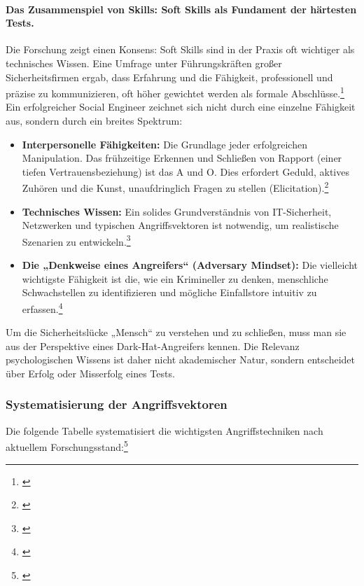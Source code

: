 \documentclass[10pt,a4paper]{article}
\begin{document}
	\paragraph{Das Zusammenspiel von Skills: Soft Skills als Fundament der härtesten Tests.}
	Die Forschung zeigt einen Konsens: Soft Skills sind in der Praxis oft wichtiger als technisches Wissen. Eine Umfrage unter Führungskräften großer Sicherheitsfirmen ergab, dass Erfahrung und die Fähigkeit, professionell und präzise zu kommunizieren, oft höher gewichtet werden als formale Abschlüsse.\footnote{\cite{SECareer}} Ein erfolgreicher Social Engineer zeichnet sich nicht durch eine einzelne Fähigkeit aus, sondern durch ein breites Spektrum:
	\begin{itemize}
		\item \textbf{Interpersonelle Fähigkeiten:} Die Grundlage jeder erfolgreichen Manipulation. Das frühzeitige Erkennen und Schließen von Rapport (einer tiefen Vertrauensbeziehung) ist das A und O. Dies erfordert Geduld, aktives Zuhören und die Kunst, unaufdringlich Fragen zu stellen (Elicitation).\footnote{\cite{SESkills}}
		\item \textbf{Technisches Wissen:} Ein solides Grundverständnis von IT-Sicherheit, Netzwerken und typischen Angriffsvektoren ist notwendig, um realistische Szenarien zu entwickeln.\footnote{\cite{ZipRecruiterSkills}}
		\item \textbf{Die „Denkweise eines Angreifers“ (Adversary Mindset):} Die vielleicht wichtigste Fähigkeit ist die, wie ein Krimineller zu denken, menschliche Schwachstellen zu identifizieren und mögliche Einfallstore intuitiv zu erfassen.\footnote{\cite{SECareer}}
	\end{itemize}
	Um die Sicherheitslücke „Mensch“ zu verstehen und zu schließen, muss man sie aus der Perspektive eines Dark-Hat-Angreifers kennen. Die Relevanz psychologischen Wissens ist daher nicht akademischer Natur, sondern entscheidet über Erfolg oder Misserfolg eines Tests.
	
	\subsubsection{Systematisierung der Angriffsvektoren}
	Die folgende Tabelle systematisiert die wichtigsten Angriffstechniken nach aktuellem Forschungsstand:\footnote{\cite{ISACA,UTSAScams}}
	
\end{document}
